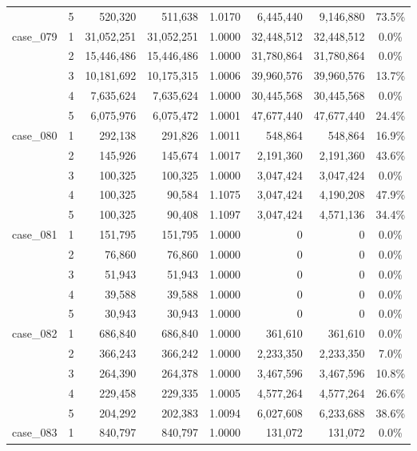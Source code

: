 \begin{footnotesize}
\begin{longtable}{l c rr c rr c}
 & 5 & 520{,}320 & 511{,}638 & 1.0170 & 6{,}445{,}440 & 9{,}146{,}880 & 73.5\% \\
\addlinespace[2pt]
case\_079 & 1 & 31{,}052{,}251 & 31{,}052{,}251 & 1.0000 & 32{,}448{,}512 & 32{,}448{,}512 & 0.0\% \\
 & 2 & 15{,}446{,}486 & 15{,}446{,}486 & 1.0000 & 31{,}780{,}864 & 31{,}780{,}864 & 0.0\% \\
 & 3 & 10{,}181{,}692 & 10{,}175{,}315 & 1.0006 & 39{,}960{,}576 & 39{,}960{,}576 & 13.7\% \\
 & 4 & 7{,}635{,}624 & 7{,}635{,}624 & 1.0000 & 30{,}445{,}568 & 30{,}445{,}568 & 0.0\% \\
 & 5 & 6{,}075{,}976 & 6{,}075{,}472 & 1.0001 & 47{,}677{,}440 & 47{,}677{,}440 & 24.4\% \\
\addlinespace[2pt]
case\_080 & 1 & 292{,}138 & 291{,}826 & 1.0011 & 548{,}864 & 548{,}864 & 16.9\% \\
 & 2 & 145{,}926 & 145{,}674 & 1.0017 & 2{,}191{,}360 & 2{,}191{,}360 & 43.6\% \\
 & 3 & 100{,}325 & 100{,}325 & 1.0000 & 3{,}047{,}424 & 3{,}047{,}424 & 0.0\% \\
 & 4 & 100{,}325 & 90{,}584 & 1.1075 & 3{,}047{,}424 & 4{,}190{,}208 & 47.9\% \\
 & 5 & 100{,}325 & 90{,}408 & 1.1097 & 3{,}047{,}424 & 4{,}571{,}136 & 34.4\% \\
\addlinespace[2pt]
case\_081 & 1 & 151{,}795 & 151{,}795 & 1.0000 & 0 & 0 & 0.0\% \\
 & 2 & 76{,}860 & 76{,}860 & 1.0000 & 0 & 0 & 0.0\% \\
 & 3 & 51{,}943 & 51{,}943 & 1.0000 & 0 & 0 & 0.0\% \\
 & 4 & 39{,}588 & 39{,}588 & 1.0000 & 0 & 0 & 0.0\% \\
 & 5 & 30{,}943 & 30{,}943 & 1.0000 & 0 & 0 & 0.0\% \\
\addlinespace[2pt]
case\_082 & 1 & 686{,}840 & 686{,}840 & 1.0000 & 361{,}610 & 361{,}610 & 0.0\% \\
 & 2 & 366{,}243 & 366{,}242 & 1.0000 & 2{,}233{,}350 & 2{,}233{,}350 & 7.0\% \\
 & 3 & 264{,}390 & 264{,}378 & 1.0000 & 3{,}467{,}596 & 3{,}467{,}596 & 10.8\% \\
 & 4 & 229{,}458 & 229{,}335 & 1.0005 & 4{,}577{,}264 & 4{,}577{,}264 & 26.6\% \\
 & 5 & 204{,}292 & 202{,}383 & 1.0094 & 6{,}027{,}608 & 6{,}233{,}688 & 38.6\% \\
\addlinespace[2pt]
case\_083 & 1 & 840{,}797 & 840{,}797 & 1.0000 & 131{,}072 & 131{,}072 & 0.0\% \\

\end{longtable}
\end{footnotesize}

